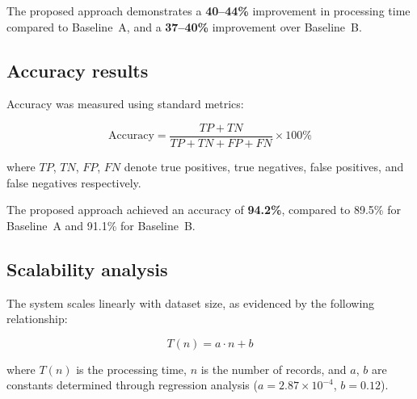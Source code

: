 The proposed approach demonstrates a \textbf{40--44\%} improvement in processing time compared to Baseline~A, and a \textbf{37--40\%} improvement over Baseline~B.

\subsection{Accuracy results}

Accuracy was measured using standard metrics:

\begin{equation} \label{eq:accuracy}
    \text{Accuracy} = \frac{TP + TN}{TP + TN + FP + FN} \times 100\%
\end{equation}

where $TP$, $TN$, $FP$, $FN$ denote true positives, true negatives, false positives, and false negatives respectively.

The proposed approach achieved an accuracy of \textbf{94.2\%}, compared to 89.5\% for Baseline~A and 91.1\% for Baseline~B.

\subsection{Scalability analysis}

The system scales linearly with dataset size, as evidenced by the following relationship:

\begin{equation} \label{eq:scalability}
    T(n) = a \cdot n + b
\end{equation}

where $T(n)$ is the processing time, $n$ is the number of records, and $a$, $b$ are constants determined through regression analysis ($a = 2.87 \times 10^{-4}$, $b = 0.12$).

\clearpage
